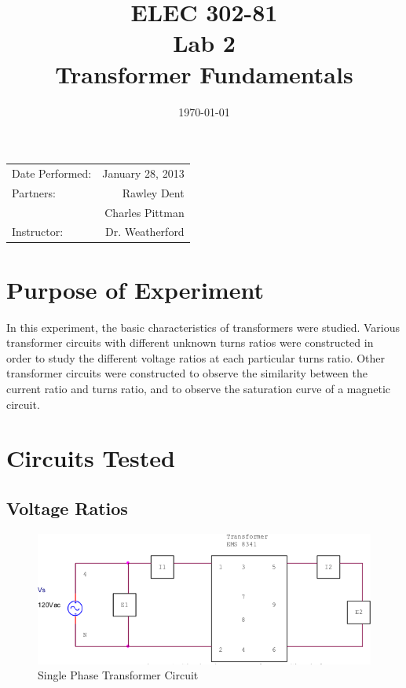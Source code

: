 \documentclass{article}
\title{ELEC 302-81\\ Lab 2\\ Transformer Fundamentals} %
\date{\today} %
\begin{document}
\maketitle

\begin{center}
  \begin{tabular}{lr}
    Date Performed: & January 28, 2013 \\
    Partners: & Rawley Dent \\
              & Charles Pittman \\
    Instructor: & Dr. Weatherford
  \end{tabular}
\end{center}

\pagebreak


\section{Purpose of Experiment}

In this experiment, the basic characteristics of transformers were studied.
Various transformer circuits with different unknown turns ratios were
constructed in order to study the different voltage ratios at each particular
turns ratio. Other transformer circuits were constructed to observe the
similarity between the current ratio and turns ratio, and to observe the
saturation curve of a magnetic circuit.

\section{Circuits Tested}
\subsection{Voltage Ratios}
\begin{figure}[H]
  \centering
  \includegraphics[width=.8\textwidth]{img/circuit_01}
  \caption{Single Phase Transformer Circuit}
  \label{fig:circuit_01}
\end{figure}
\end{document}
